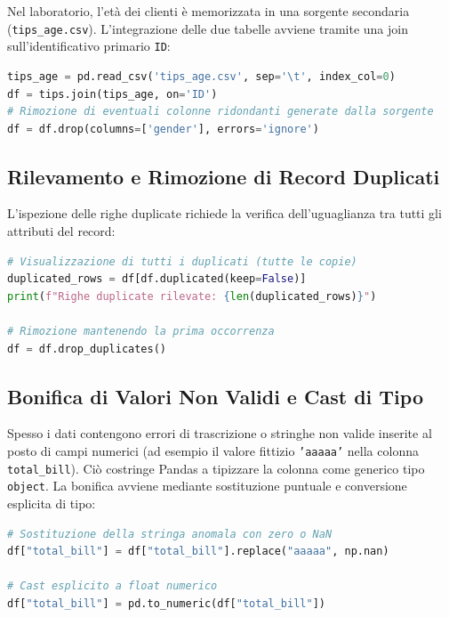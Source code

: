 Nel laboratorio, l'età dei clienti è memorizzata in una sorgente secondaria (\texttt{tips\_age.csv}). L'integrazione delle due tabelle avviene tramite una join sull'identificativo primario \texttt{ID}:

\begin{lstlisting}[language=Python, style=code]
tips_age = pd.read_csv('tips_age.csv', sep='\t', index_col=0)
df = tips.join(tips_age, on='ID')
# Rimozione di eventuali colonne ridondanti generate dalla sorgente
df = df.drop(columns=['gender'], errors='ignore')
\end{lstlisting}

\FloatBarrier
\subsection{Rilevamento e Rimozione di Record Duplicati}

L'ispezione delle righe duplicate richiede la verifica dell'uguaglianza tra tutti gli attributi del record:

\begin{lstlisting}[language=Python, style=code]
# Visualizzazione di tutti i duplicati (tutte le copie)
duplicated_rows = df[df.duplicated(keep=False)]
print(f"Righe duplicate rilevate: {len(duplicated_rows)}")

# Rimozione mantenendo la prima occorrenza
df = df.drop_duplicates()
\end{lstlisting}

\FloatBarrier
\subsection{Bonifica di Valori Non Validi e Cast di Tipo}

Spesso i dati contengono errori di trascrizione o stringhe non valide inserite al posto di campi numerici (ad esempio il valore fittizio \texttt{'aaaaa'} nella colonna \texttt{total\_bill}). Ciò costringe Pandas a tipizzare la colonna come generico tipo \texttt{object}. La bonifica avviene mediante sostituzione puntuale e conversione esplicita di tipo:

\begin{lstlisting}[language=Python, style=code]
# Sostituzione della stringa anomala con zero o NaN
df["total_bill"] = df["total_bill"].replace("aaaaa", np.nan)

# Cast esplicito a float numerico
df["total_bill"] = pd.to_numeric(df["total_bill"])
\end{lstlisting}

